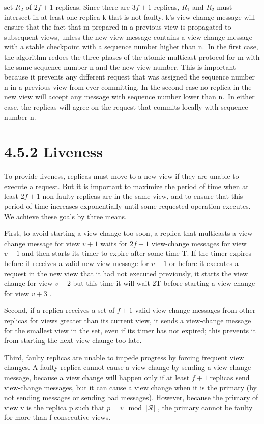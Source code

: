 \documentclass[
]{article}
\begin{document}
set \(R_{2}\) of \(2f + 1\) replicas. Since there are \(3f + 1\)
replicas, \(R_{1}\) and \(R_{2}\) must intersect in at least one replica
k that is not faulty. k's view-change message will ensure that the fact
that m prepared in a previous view is propagated to subsequent views,
unless the new-view message contains a view-change message with a stable
checkpoint with a sequence number higher than n.~In the first case, the
algorithm redoes the three phases of the atomic multicast protocol for m
with the same sequence number n and the new view number. This is
important because it prevents any different request that was assigned
the sequence number n in a previous view from ever committing. In the
second case no replica in the new view will accept any message with
sequence number lower than n.~In either case, the replicas will agree on
the request that commits locally with sequence number n.

\section{4.5.2 Liveness}\label{liveness}

To provide liveness, replicas must move to a new view if they are unable
to execute a request. But it is important to maximize the period of time
when at least \(2f + 1\) non-faulty replicas are in the same view, and
to ensure that this period of time increases exponentially until some
requested operation executes. We achieve these goals by three means.

First, to avoid starting a view change too soon, a replica that
multicasts a view-change message for view \(v + 1\) waits for \(2f + 1\)
view-change messages for view \(v + 1\) and then starts its timer to
expire after some time T. If the timer expires before it receives a
valid new-view message for \(v + 1\) or before it executes a request in
the new view that it had not executed previously, it starts the view
change for view \(v + 2\) but this time it will wait 2T before starting
a view change for view \(v + 3\) .

Second, if a replica receives a set of \(f + 1\) valid view-change
messages from other replicas for views greater than its current view, it
sends a view-change message for the smallest view in the set, even if
its timer has not expired; this prevents it from starting the next view
change too late.

Third, faulty replicas are unable to impede progress by forcing frequent
view changes. A faulty replica cannot cause a view change by sending a
view-change message, because a view change will happen only if at least
\(f + 1\) replicas send view-change messages, but it can cause a view
change when it is the primary (by not sending messages or sending bad
messages). However, because the primary of view v is the replica p such
that \(p = v \mod |\mathcal{R}|\) , the primary cannot be faulty for
more than f consecutive views.
\end{document}
